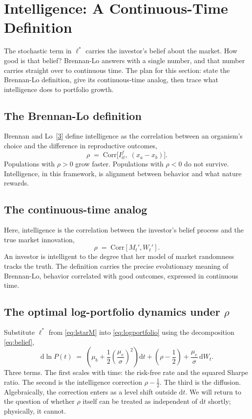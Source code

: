 \documentclass[11pt]{article}
\newcommand{\lopt}{\ell^{*}}
\newcommand{\mue}{\mu_{e}}
\newcommand{\mub}{\mu_{b}}
\newcommand{\Corr}{\mathrm{Corr}}
\newcommand{\dd}{\mathrm{d}}
\begin{document}
\section{Intelligence: A Continuous-Time Definition}

The stochastic term in $\lopt$ carries the investor's belief about the
market. How good is that belief? Brennan-Lo answers with a single
number, and that number carries straight over to continuous time. The
plan for this section: state the Brennan-Lo definition, give its
continuous-time analog, then trace what intelligence does to portfolio
growth.

\subsection{The Brennan-Lo definition}

Brennan and Lo~[\hyperlink{ref:3}{3}] define intelligence as the correlation between an
organism's choice and the difference in reproductive outcomes,
\[
  \rho \;=\; \Corr\!\bigl[I^{f}_{it},\; (x_{a} - x_{b})\bigr].
\]
Populations with $\rho > 0$ grow faster. Populations with $\rho < 0$
do not survive. Intelligence, in this framework, is alignment between
behavior and what nature rewards.

\subsection{The continuous-time analog}

Here, intelligence is the correlation between the investor's belief
process and the true market innovation,
\[
  \rho \;=\; \Corr[M_{t}', W_{t}'].
\]
An investor is intelligent to the degree that her model of market
randomness tracks the truth. The definition carries the precise
evolutionary meaning of Brennan-Lo, behavior correlated with good outcomes, expressed in continuous time.

\subsection{The optimal log-portfolio dynamics under $\rho$}

Substitute $\lopt$ from \eqref{eq:lstarM} into \eqref{eq:logportfolio}
using the decomposition \eqref{eq:belief},
\begin{equation}
  \dd\ln P(t) \;=\; \left(\mub
  + \frac{1}{2}\left(\frac{\mue}{\sigma}\right)^{\!2}\right)\dd t
  + \left(\rho - \frac{1}{2}\right)
  + \frac{\mue}{\sigma}\,\dd W_{t}.
  \label{eq:optlogdyn}
\end{equation}
Three terms. The first scales with time: the risk-free rate and the
squared Sharpe ratio. The second is the intelligence correction
$\rho - \tfrac{1}{2}$. The third is the diffusion. Algebraically,
the correction enters as a level shift outside $\dd t$. We will
return to the question of whether $\rho$ itself can be treated as
independent of $\dd t$ shortly; physically, it cannot.
\end{document}
